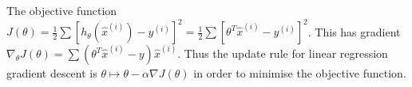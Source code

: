 %
%
\begin{answer}
The objective function $J(\theta) = \frac{1}{2} \sum [h_\theta (\hat{x}^{(i)}) - y^{(i)}]^2 = \frac{1}{2} \sum [\theta^T \hat{x}^{(i)} - y^{(i)}]^2$. This has gradient $\nabla_\theta J(\theta) = \sum (\theta^T \hat{x}^{(i)} - y) \hat{x}^{(i)}$. Thus the update rule for linear regression gradient descent is $\theta \mapsto \theta - \alpha \nabla J(\theta)$ in order to minimise the objective function.
\end{answer}
%